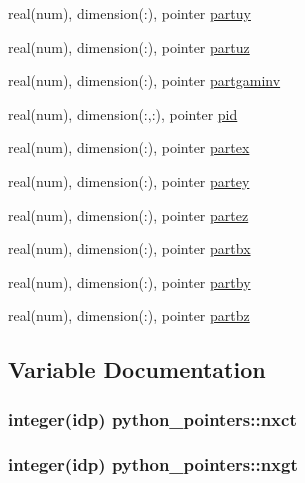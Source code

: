 \begin{DoxyCompactItemize}
real(num), dimension(\+:), pointer \hyperlink{namespacepython__pointers_a60b173a25b047377d55cd66dfb5fad04}{partuy}
\item 
real(num), dimension(\+:), pointer \hyperlink{namespacepython__pointers_a98c8cf1649933f3239b068104d637d6c}{partuz}
\item 
real(num), dimension(\+:), pointer \hyperlink{namespacepython__pointers_a072266fc5f086ac68bdb72332b296a07}{partgaminv}
\item 
real(num), dimension(\+:,\+:), pointer \hyperlink{namespacepython__pointers_a8a754456a1a3440c897f9a6249782713}{pid}
\item 
real(num), dimension(\+:), pointer \hyperlink{namespacepython__pointers_ad4fc57017cff184e92ae60ff0006c62c}{partex}
\item 
real(num), dimension(\+:), pointer \hyperlink{namespacepython__pointers_af358e4be4f10aeff30df94181589c382}{partey}
\item 
real(num), dimension(\+:), pointer \hyperlink{namespacepython__pointers_a61f858897e873f37d7bb3e355e2b9740}{partez}
\item 
real(num), dimension(\+:), pointer \hyperlink{namespacepython__pointers_a9de58f9a1f88381cac4457014ee8859f}{partbx}
\item 
real(num), dimension(\+:), pointer \hyperlink{namespacepython__pointers_aab1fc483934951de61c30198fa476e40}{partby}
\item 
real(num), dimension(\+:), pointer \hyperlink{namespacepython__pointers_a9c50a4b64ff01114243eebc0dc729ae8}{partbz}
\end{DoxyCompactItemize}


\subsection{Variable Documentation}
\subsubsection[{\texorpdfstring{nxct}{nxct}}]{\setlength{\rightskip}{0pt plus 5cm}integer(idp) python\+\_\+pointers\+::nxct}\hypertarget{namespacepython__pointers_a75ab930be0836b533be53654ce5e7e94}{}\label{namespacepython__pointers_a75ab930be0836b533be53654ce5e7e94}
\subsubsection[{\texorpdfstring{nxgt}{nxgt}}]{\setlength{\rightskip}{0pt plus 5cm}integer(idp) python\+\_\+pointers\+::nxgt}\hypertarget{namespacepython__pointers_ae4f4f06a80f2084571ee0a1f4b3348c3}{}\label{namespacepython__pointers_ae4f4f06a80f2084571ee0a1f4b3348c3}
